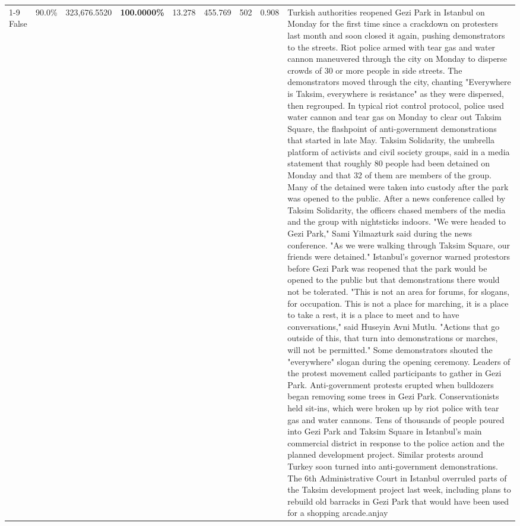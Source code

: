 \begin{table}[H]
\begin{tabular}{lllrlllll}
\cline{1-9}
False & 90.0\% & 323,676.5520 & \bfseries \color{red} 100.0000\% & 13.278 & 455.769 & 502 & 0.908 & Turkish authorities reopened Gezi Park in Istanbul on Monday for the first time since a crackdown on protesters last month and soon closed it again, pushing demonstrators to the streets. Riot police armed with tear gas and water cannon maneuvered through the city on Monday to disperse crowds of 30 or more people in side streets. The demonstrators moved through the city, chanting "Everywhere is Taksim, everywhere is resistance" as they were dispersed, then regrouped. In typical riot control protocol, police used water cannon and tear gas on Monday to clear out Taksim Square, the flashpoint of anti-government demonstrations that started in late May. Taksim Solidarity, the umbrella platform of activists and civil society groups, said in a media statement that roughly 80 people had been detained on Monday and that 32 of them are members of the group. Many of the detained were taken into custody after the park was opened to the public. After a news conference called by Taksim Solidarity, the officers chased members of the media and the group with nightsticks indoors. "We were headed to Gezi Park," Sami Yilmazturk said during the news conference. "As we were walking through Taksim Square, our friends were detained." Istanbul's governor warned protestors before Gezi Park was reopened that the park would be opened to the public but that demonstrations there would not be tolerated. "This is not an area for forums, for slogans, for occupation. This is not a place for marching, it is a place to take a rest, it is a place to meet and to have conversations," said Huseyin Avni Mutlu. "Actions that go outside of this, that turn into demonstrations or marches, will not be permitted." Some demonstrators shouted the "everywhere" slogan during the opening ceremony. Leaders of the protest movement called participants to gather in Gezi Park. Anti-government protests erupted when bulldozers began removing some trees in Gezi Park. Conservationists held sit-ins, which were broken up by riot police with tear gas and water cannons. Tens of thousands of people poured into Gezi Park and Taksim Square in Istanbul's main commercial district in response to the police action and the planned development project. Similar protests around Turkey soon turned into anti-government demonstrations. The 6th Administrative Court in Istanbul overruled parts of the Taksim development project last week, including plans to rebuild old barracks in Gezi Park that would have been used for a shopping arcade.anjay \\

\end{tabular}
\end{table}
